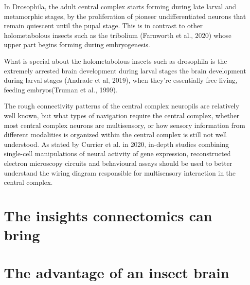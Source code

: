 In Drosophila,  the adult central complex starts forming during late larval and metamorphic stages, by the proliferation of pioneer undifferentiated neurons that remain quiescent until the pupal stage. This is in contrast to other holometabolous insects such as the tribolium (Farnworth et al., 2020) whose upper part begins forming during embryogenesis. 
    
What is special about the holometabolous insects such as drosophila is the extremely arrested brain development during larval stages the brain development during larval stages (Andrade et al, 2019), when they’re essentially free-living, feeding embryos(Truman et al., 1999).    
    
The rough connectivity patterns of the central complex neuropils are relatively well known, but what types of navigation require the central complex, whether most central complex neurons are multisensory, or how sensory information from different modalities is organized within the central complex is still not well understood. As stated by Currier et al. in 2020, in-depth studies combining single-cell manipulations of neural activity of gene expression, reconstructed electron microscopy circuits and behavioural assays should be used to better understand the wiring diagram responsible for multisensory interaction in the central complex.

\section{The insights connectomics can bring}

\section{The advantage of an insect brain}